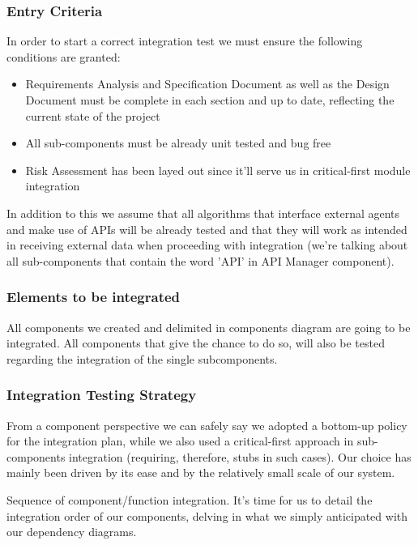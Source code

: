\subsubsection{Entry Criteria}
	In order to start a correct integration test we must ensure the following conditions are granted:

	\begin{itemize}
		\item Requirements Analysis and Specification Document as well as the Design Document must be complete in each section and up to date, reflecting the current state of the project
		\item All sub-components must be already unit tested and bug free
		\item Risk Assessment has been layed out since it'll serve us in critical-first module integration
	\end{itemize}

	In addition to this we assume that all algorithms that interface external agents and make use of APIs will be already tested and that they will work as intended in receiving external data when proceeding with integration (we're talking about all sub-components that contain the word 'API' in API Manager component).


\subsubsection{Elements to be integrated}
	All components we created and delimited in components diagram are going to be integrated. All components that give the chance to do so, will also be tested regarding the integration of the single subcomponents.

\subsubsection{Integration Testing Strategy}
	From a component perspective we can safely say we adopted a bottom-up policy for the integration plan, while we also used a critical-first approach in sub-components integration (requiring, therefore, stubs in such cases). 
	Our choice has mainly been driven by its ease and by the relatively small scale of our system.
	
	Sequence of component/function integration.
	It's time for us to detail the integration order of our components, delving in what we simply anticipated with our dependency diagrams.

